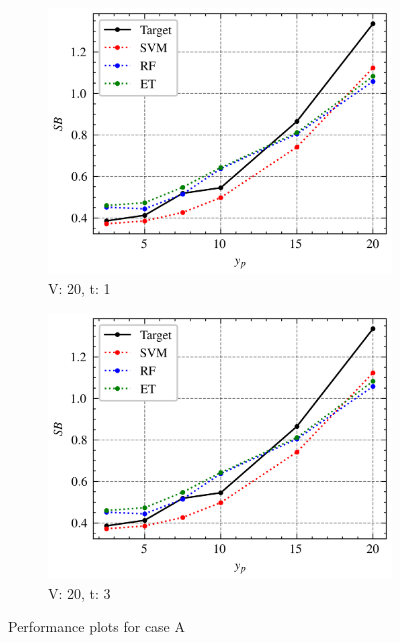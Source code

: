 \begin{figure}[H]
    \begin{tcolorbox}[arc=0pt,boxrule=0.5pt]
        \begin{subfigure}{0.5\textwidth}
            \includegraphics[width=\textwidth]{chap5/images/performance_20_3}
            \caption{V: 20, t: 1}
            \label{fig:performance-20-3-1}
        \end{subfigure}
        \hfill
        \begin{subfigure}{0.5\textwidth}
            \includegraphics[width=\textwidth]{chap5/images/performance_20_3}
            \caption{V: 20, t: 3}
            \label{fig:performance-20-3-2}
        \end{subfigure}
    \end{tcolorbox}
    \caption{Performance plots for case A}
    \label{fig:performance-case-a}
\end{figure}


